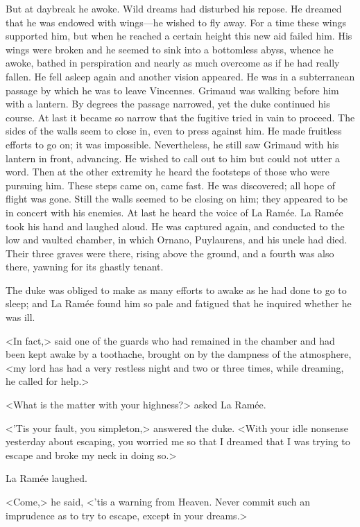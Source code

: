 But at daybreak he awoke. Wild dreams had disturbed his repose. He dreamed that he was endowed with wings—he wished to fly away. For a time these wings supported him, but when he reached a certain height this new aid failed him. His wings were broken and he seemed to sink into a bottomless abyss, whence he awoke, bathed in perspiration and nearly as much overcome as if he had really fallen. He fell asleep again and another vision appeared. He was in a subterranean passage by which he was to leave Vincennes. Grimaud was walking before him with a lantern. By degrees the passage narrowed, yet the duke continued his course. At last it became so narrow that the fugitive tried in vain to proceed. The sides of the walls seem to close in, even to press against him. He made fruitless efforts to go on; it was impossible. Nevertheless, he still saw Grimaud with his lantern in front, advancing. He wished to call out to him but could not utter a word. Then at the other extremity he heard the footsteps of those who were pursuing him. These steps came on, came fast. He was discovered; all hope of flight was gone. Still the walls seemed to be closing on him; they appeared to be in concert with his enemies. At last he heard the voice of La Ramée. La Ramée took his hand and laughed aloud. He was captured again, and conducted to the low and vaulted chamber, in which Ornano, Puylaurens, and his uncle had died. Their three graves were there, rising above the ground, and a fourth was also there, yawning for its ghastly tenant.

The duke was obliged to make as many efforts to awake as he had done to go to sleep; and La Ramée found him so pale and fatigued that he inquired whether he was ill.

<In fact,> said one of the guards who had remained in the chamber and had been kept awake by a toothache, brought on by the dampness of the atmosphere, <my lord has had a very restless night and two or three times, while dreaming, he called for help.>

<What is the matter with your highness?> asked La Ramée.

<'Tis your fault, you simpleton,> answered the duke. <With your idle nonsense yesterday about escaping, you worried me so that I dreamed that I was trying to escape and broke my neck in doing so.>

La Ramée laughed.

<Come,> he said, <'tis a warning from Heaven. Never commit such an imprudence as to try to escape, except in your dreams.>

